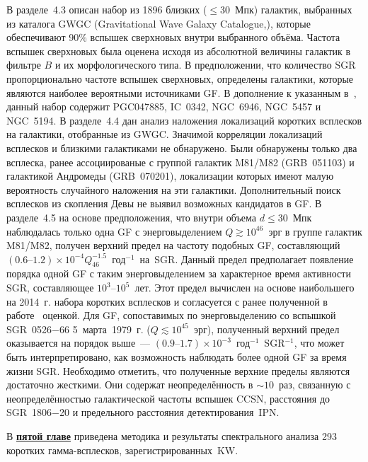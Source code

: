 В разделе~4.3 описан набор из 1896 близких ($\le 30$~Мпк) галактик, 
выбранных из каталога GWGC (Gravitational Wave Galaxy Catalogue,\citep{White2011CQGra}),
которые обеспечивают 90\% вспышек сверхновых внутри выбранного объёма.
Частота вспышек сверхновых была оценена исходя из абсолютной величины галактик 
в фильтре $B$ и их морфологического типа. 
В предположении, что количество SGR пропорционально частоте вспышек сверхновых, 
определены галактики, которые являются наиболее вероятными источниками GF. 
В дополнение к указанным в~\citep{Popov2006}, данный набор содержит 
PGC047885, IC~0342, NGC~6946, NGC~5457 и NGC~5194.
В разделе~4.4 дан анализ наложения 
локализаций коротких всплесков на галактики, отобранные из GWGC. Значимой 
корреляции локализаций всплесков и близкими галактиками не обнаружено. 
Были обнаружены только два всплеска, ранее ассоциированые 
с группой галактик M81/M82 (GRB~051103) и галактикой Андромеды (GRB~070201),
локализации которых имеют малую вероятность случайного наложения на эти галактики.
Дополнительный поиск всплесков из скопления Девы не выявил возможных кандидатов в GF.
В разделе~4.5 на основе предположения, что внутри объема $d \le 30$~Мпк наблюдалась 
только одна GF с энерговыделением $Q \gtrsim 10^{46}$~эрг в группе галактик M81/M82, 
получен верхний предел на частоту подобных GF, составляющий 
${(0.6\textrm{--}1.2)\times 10^{-4} Q_{46}^{-1.5}}$~год$^{-1}$~на~SGR.  
Данный предел предполагает появление порядка одной GF с таким энерговыделением 
за  характерное время активности SGR, составляющее $10^3\textrm{--}10^5$~лет. 
Этот предел вычислен на основе наибольшего на 2014~г.  
набора коротких всплесков и согласуется с ранее полученной в работе~\citep{Ofek_2007ApJ} оценкой. 
Для GF, сопоставимых по энерговыделению со вспышкой SGR~0526$-$66 5~марта~1979~г. ($Q \lesssim 10^{45}$~эрг), 
полученный верхний предел оказывается на порядок выше~--- $(0.9\textrm{--}1.7)\times 10^{-3}$~год$^{-1}$~SGR$^{-1}$,  
что может быть интерпретировано, как возможность наблюдать более одной GF за время жизни SGR.
Необходимо отметить, что полученные верхние пределы являются достаточно жесткими. 
Они содержат неопределённость в $\sim 10$~раз, связанную с
неопределённостью галактической частоты вспышек CCSN, расстояния до SGR~1806$-$20 и
предельного расстояния детектирования~IPN.

В \underline{\textbf{пятой главе}} приведена методика и результаты спектрального 
анализа 293 коротких гамма-всплесков, зарегистрированных~KW.

